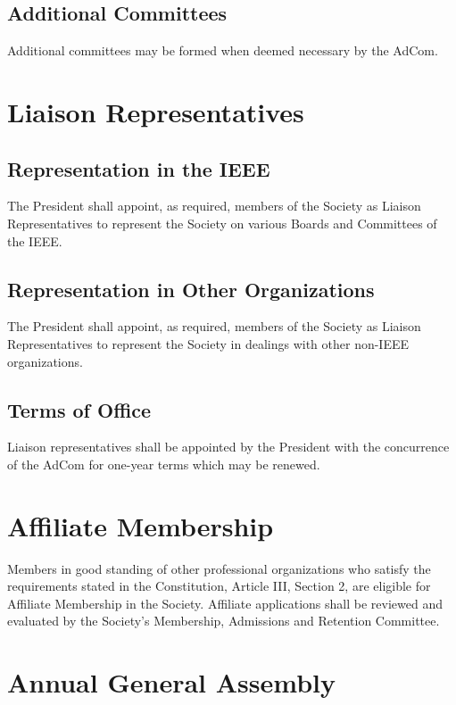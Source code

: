 \documentclass[10pt]{article}
\begin{document}
\subsection{Additional Committees}

Additional committees may be formed when deemed necessary by the AdCom.   

\section{Liaison Representatives}
\subsection{Representation in the IEEE}

The President shall appoint, as required, members of the Society as Liaison Representatives to represent the Society on various Boards and Committees of the IEEE.

\subsection{Representation in Other Organizations}

The President shall appoint, as required, members of the Society as Liaison Representatives to represent the Society in dealings with other non-IEEE organizations.

\subsection{Terms of Office}

Liaison representatives shall be appointed by the President with the concurrence of the AdCom for one-year terms which may be renewed.

\section{Affiliate Membership}

Members in good standing of other professional organizations who satisfy the requirements stated in the Constitution, Article III, Section 2, are eligible for Affiliate Membership in the Society. Affiliate applications shall be reviewed and evaluated by the Society's Membership, Admissions and Retention Committee.

\section{Annual General Assembly}
\end{document}
